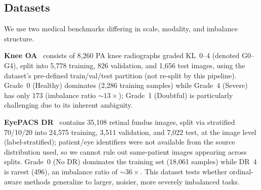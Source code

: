 \documentclass[runningheads]{svproc}
\begin{document}
\begin{table}[!ht]
\centering
\caption{Summary of the six compared configurations.}
\label{tab:config}
\small
{}
\end{table}

\FloatBarrier
\subsection{Datasets}

We use two medical benchmarks differing in scale, modality, and imbalance structure.

\textbf{Knee OA}~\cite{kaggle_koa} consists of 8{,}260 PA knee radiographs graded KL~0--4 (denoted G0--G4), split into 5{,}778 training, 826 validation, and 1{,}656 test images, using the dataset's pre-defined train/val/test partition (not re-split by this pipeline). Grade~0 (Healthy) dominates (2{,}286 training samples) while Grade~4 (Severe) has only 173 (imbalance ratio $\sim\!13\times$); Grade~1 (Doubtful) is particularly challenging due to its inherent ambiguity.

\textbf{EyePACS DR}~\cite{kaggle_dr,gulshan2016development} contains 35{,}108 retinal fundus images, split via stratified 70/10/20 into 24{,}575 training, 3{,}511 validation, and 7{,}022 test, at the image level (label-stratified); patient/eye identifiers were not available from the source distribution used, so we cannot rule out same-patient images appearing across splits. Grade~0 (No DR) dominates the training set (18{,}061 samples) while DR~4 is rarest (496), an imbalance ratio of $\sim\!36\times$. This dataset tests whether ordinal-aware methods generalize to larger, noisier, more severely imbalanced tasks.
\end{document}
